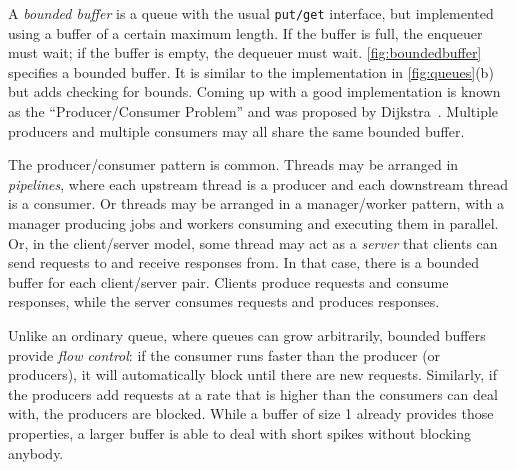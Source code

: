 \documentclass{report}
\begin{document}
A \emph{bounded buffer} is
a queue with the usual \texttt{put/get} interface,
but implemented using a buffer
of a certain maximum length.
If the buffer is full, the enqueuer must wait; if the buffer is empty, the
dequeuer must wait.
\autoref{fig:boundedbuffer} specifies a bounded buffer.
It is similar to the implementation in \autoref{fig:queues}(b) but adds
checking for bounds.
Coming up with a good implementation is known as the
``Producer/Consumer Problem'' and was
proposed by Dijkstra~\cite{EWD329}.
Multiple producers and multiple consumers may all share
the same bounded buffer.

The producer/consumer pattern is common.  Threads may be arranged
in \emph{pipelines},
%
where each upstream thread is a producer and each downstream
thread is a consumer.
Or threads may be arranged in a manager/worker pattern, with a manager
producing jobs and workers consuming and executing them in parallel.
Or, in the client/server model,
%
some thread may act as a \emph{server} that clients can send requests to
and receive responses from.  In that case, there is a bounded buffer
for each client/server pair. Clients produce requests and
consume responses, while the server consumes requests and produces responses.

%
Unlike an ordinary queue, where queues can grow arbitrarily, bounded buffers
provide \emph{flow control}: if the consumer runs faster than the producer
(or producers), it will automatically block until there are new requests.
Similarly, if the producers add requests at a rate that is higher than the
consumers can deal with, the producers are blocked.  While a buffer of size 1
already provides those properties, a larger buffer is able to deal with short
spikes without blocking anybody.
\end{document}

